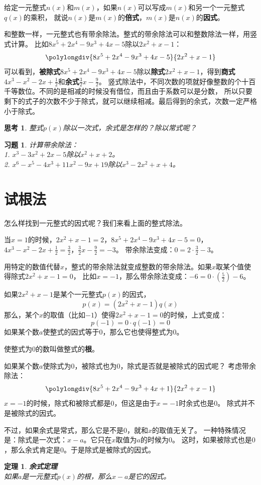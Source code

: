 \documentclass[12pt,UTF8]{ctexbook}
\newtheorem{tm}{定理}[section]
\newtheorem{sk}{思考}[section]
\newtheorem{xt}{习题}[section]
\begin{document}
给定一元整式$n(x)$和$m(x)$，如果$n(x)$可以写成$m(x)$和另一个一元整式$q(x)$的乘积，
就说$n(x)$是$m(x)$的\textbf{倍式}，$m(x)$是$n(x)$的\textbf{因式}。

和整数一样，一元整式也有带余除法。整式的带余除法可以和整数除法一样，用竖式计算。
比如$8x^5 +2x^4 -9x^3+ 4x-5$除以$2x^2+x-1$：
$$\polylongdiv{8x^5 +2x^4 -9x^3+ 4x-5}{2x^2+x-1}$$
可以看到，\textbf{被除式}$8x^5 +2x^4 -9x^3+ 4x-5$除以\textbf{除式}$2x^2+x-1$，得到\textbf{商式}$4x^3-x^2-2x+\frac12$和\textbf{余式}$\frac32 x- \frac92$。
竖式除法中，不同次数的项就好像整数的个十百千等数位。不同的是相减的时候没有借位，而且由于系数可以是分数，
所以只要剩下的式子的次数不少于除式，就可以继续相减。最后得到的余式，次数一定严格小于除式。
\begin{sk}\label{sk:2-0-0}
    整式$p(x)$除以一次式，余式是怎样的？除以常式呢？
\end{sk}
\begin{xt}\label{xt:2-0-0}
    计算带余除法：\\
    1. $x^3 - 3x^2 + 2x - 5$除以$x^2 + x + 2$。\\
    2. $x^6 - x^5 - 4x^3 + 11x^2 - 9x + 19$除以$x^3 - 2x^2 + x + 4$。
\end{xt}

\section{试根法}
怎么样找到一元整式的因式呢？我们来看上面的整式除法。

当$x=1$的时候，$2x^2+x-1 = 2$，$8x^5 +2x^4 -9x^3+ 4x-5 = 0$，
$4x^3-x^2-2x+\frac12 = \frac32$，$\frac32 x- \frac92 = -3$。
带余除法变成：$0 = 2 \cdot \frac32 - 3$。

用特定的数值代替$x$，整式的带余除法就变成整数的带余除法。如果$x$取某个值使得除式$2x^2 + x - 1 = 0$，
比如$x = -1$，那么带余除法变成：$-6 = 0\cdot \left(\frac52\right) - 6$。

如果$2x^2 + x - 1$是某个一元整式$p(x)$的因式，
$$ p(x) = (2x^2 + x - 1)q(x)$$
那么，某个$x$的取值（比如$-1$）使得$2x^2 + x - 1 = 0$的时候，上式变成：
$$ p(-1) = 0 \cdot q(-1) = 0$$
如果某个数$a$使整式的因式等于$0$，那么它也使得整式为$0$。

使整式为$0$的数叫做整式的\textbf{根}。

如果某个数$a$使除式为$0$，被除式也为$0$，除式是否就是被除式的因式呢？
考虑带余除法：
$$\polylongdiv{8x^5 +2x^4 -9x^3+ 4x+1}{2x^2+x-1}$$
$x = -1$的时候，除式和被除式都是$0$，但这是由于$x = -1$时余式也是$0$。
除式并不是被除式的因式。

不过，如果余式是常式，那么它是不是$0$，就和$x$的取值无关了。
一种特殊情况是：除式是一次式：$x - a$。它只在$x$取值为$a$的时候为$0$。
这时，如果被除式也是$0$，那么余式肯定是$0$。于是除式是被除式的因式。
\begin{tm}\textbf{余式定理}\label{tm:2-1-0}
    \mbox{} \\
    如果$a$是一元整式$p(x)$的根，那么$x-a$是它的因式。
\end{tm}
\end{document}
